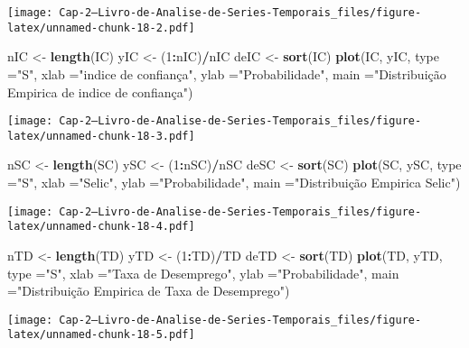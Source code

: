 \documentclass[]{article}
\newenvironment{Shaded}{\begin{snugshade}}{\end{snugshade}}
\newcommand{\DataTypeTok}[1]{\textcolor[rgb]{0.13,0.29,0.53}{#1}}
\newcommand{\DecValTok}[1]{\textcolor[rgb]{0.00,0.00,0.81}{#1}}
\newcommand{\KeywordTok}[1]{\textcolor[rgb]{0.13,0.29,0.53}{\textbf{#1}}}
\newcommand{\NormalTok}[1]{#1}
\newcommand{\OperatorTok}[1]{\textcolor[rgb]{0.81,0.36,0.00}{\textbf{#1}}}
\newcommand{\StringTok}[1]{\textcolor[rgb]{0.31,0.60,0.02}{#1}}
\begin{document}
\texttt{[image: Cap-2---Livro-de-Analise-de-Series-Temporais\_files/figure-latex/unnamed-chunk-18-2.pdf]}

\begin{Shaded}
\begin{Highlighting}[]
\NormalTok{nIC <-}\StringTok{ }\KeywordTok{length}\NormalTok{(IC)}
\NormalTok{yIC <-}\StringTok{ }\NormalTok{(}\DecValTok{1}\OperatorTok{:}\NormalTok{nIC)}\OperatorTok{/}\NormalTok{nIC}
\NormalTok{deIC <-}\StringTok{ }\KeywordTok{sort}\NormalTok{(IC)}
\KeywordTok{plot}\NormalTok{(IC, yIC, }\DataTypeTok{type =}\StringTok{"S"}\NormalTok{, }\DataTypeTok{xlab =}\StringTok{"indice de confiança"}\NormalTok{, }\DataTypeTok{ylab =}\StringTok{"Probabilidade"}\NormalTok{, }\DataTypeTok{main =}\StringTok{"Distribuição Empirica de indice de confiança"}\NormalTok{)}
\end{Highlighting}
\end{Shaded}

\texttt{[image: Cap-2---Livro-de-Analise-de-Series-Temporais\_files/figure-latex/unnamed-chunk-18-3.pdf]}

\begin{Shaded}
\begin{Highlighting}[]
\NormalTok{nSC <-}\StringTok{ }\KeywordTok{length}\NormalTok{(SC)}
\NormalTok{ySC <-}\StringTok{ }\NormalTok{(}\DecValTok{1}\OperatorTok{:}\NormalTok{nSC)}\OperatorTok{/}\NormalTok{nSC}
\NormalTok{deSC <-}\StringTok{ }\KeywordTok{sort}\NormalTok{(SC)}
\KeywordTok{plot}\NormalTok{(SC, ySC, }\DataTypeTok{type =}\StringTok{"S"}\NormalTok{, }\DataTypeTok{xlab =}\StringTok{"Selic"}\NormalTok{, }\DataTypeTok{ylab =}\StringTok{"Probabilidade"}\NormalTok{, }\DataTypeTok{main =}\StringTok{"Distribuição Empirica Selic"}\NormalTok{)}
\end{Highlighting}
\end{Shaded}

\texttt{[image: Cap-2---Livro-de-Analise-de-Series-Temporais\_files/figure-latex/unnamed-chunk-18-4.pdf]}

\begin{Shaded}
\begin{Highlighting}[]
\NormalTok{nTD <-}\StringTok{ }\KeywordTok{length}\NormalTok{(TD)}
\NormalTok{yTD <-}\StringTok{ }\NormalTok{(}\DecValTok{1}\OperatorTok{:}\NormalTok{TD)}\OperatorTok{/}\NormalTok{TD}
\NormalTok{deTD <-}\StringTok{ }\KeywordTok{sort}\NormalTok{(TD)}
\KeywordTok{plot}\NormalTok{(TD, yTD, }\DataTypeTok{type =}\StringTok{"S"}\NormalTok{, }\DataTypeTok{xlab =}\StringTok{"Taxa de Desemprego"}\NormalTok{, }\DataTypeTok{ylab =}\StringTok{"Probabilidade"}\NormalTok{, }\DataTypeTok{main =}\StringTok{"Distribuição Empirica de Taxa de Desemprego"}\NormalTok{)}
\end{Highlighting}
\end{Shaded}

\texttt{[image: Cap-2---Livro-de-Analise-de-Series-Temporais\_files/figure-latex/unnamed-chunk-18-5.pdf]}
\end{document}
